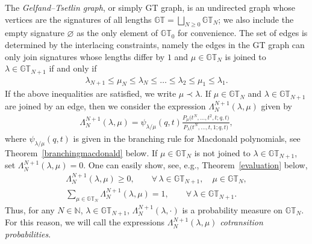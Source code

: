 \documentclass[pdftex]{sigma}
\numberwithin{equation}{section}
\newcommand{\N}{\mathbb{N}}
\newcommand{\GT}{\mathbb{GT}}
\begin{document}
The \textit{Gelfand--Tsetlin graph}, or simply GT graph, is an undirected graph whose vertices are the signatures of all lengths $\GT = \bigsqcup\limits_{N\geq 0}{\GT_N}$; we also include the empty signature $\varnothing$ as the only element of $\GT_0$ for convenience. The set of edges is determined by the interlacing constraints, namely the edges in the GT graph can only join signatures whose lengths dif\/fer by $1$ and $\mu\in\GT_N$ is joined to $\lambda\in\GT_{N+1}$ if and only if
\begin{gather*}
\lambda_{N+1} \leq \mu_N \leq \lambda_N \leq \dots \leq \lambda_2 \leq \mu_1 \leq \lambda_1.
\end{gather*}
If the above inequalities are satisf\/ied, we write $\mu \prec \lambda$. If $\mu\in\GT_N$ and $\lambda\in\GT_{N+1}$ are joined by an edge, then we consider the expression $\Lambda^{N+1}_N(\lambda, \mu)$ given by
\begin{gather*}
\Lambda^{N+1}_N(\lambda, \mu) = \psi_{\lambda/\mu}(q, t)\frac{P_{\mu}\big(t^N, \dots, t^2, t; q, t\big)}{P_{\lambda}\big(t^N, \dots, t, 1; q, t\big)},
\end{gather*}
where $\psi_{\lambda/\mu}(q, t)$ is given in the branching rule for Macdonald polynomials, see Theorem~\ref{branchingmacdonald} below. If $\mu\in\GT_N$ is not joined to $\lambda\in\GT_{N+1}$, set $\Lambda^{N+1}_N(\lambda, \mu) = 0$.
One can easily show, see, e.g., Theorem~\ref{evaluation} below,
\begin{gather*}
\Lambda^{N+1}_N(\lambda, \mu) \geq 0, \qquad \forall\, \lambda\in\GT_{N+1}, \quad \mu\in\GT_N,\\
\sum_{\mu\in\GT_N}{\Lambda^{N+1}_N(\lambda, \mu)} = 1, \qquad \forall\, \lambda\in\GT_{N+1}.
\end{gather*}
Thus, for any $N\in\N$, $\lambda\in\GT_{N+1}$, $\Lambda^{N+1}_N(\lambda, \cdot)$ is a probability measure on $\GT_N$. For this reason, we will call the expressions $\Lambda^{N+1}_N(\lambda, \mu)$ \textit{cotransition probabilities}.
\end{document}
